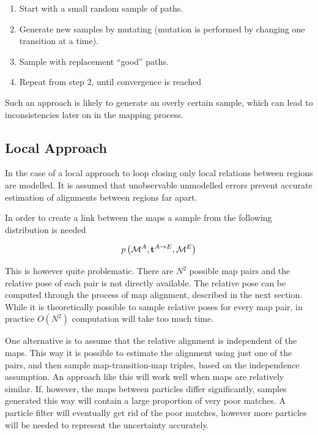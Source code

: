 \begin{enumerate}
\item Start with a small random sample of paths. 
\item Generate new samples by mutating (mutation is performed by
  changing one transition at a time).
\item Sample with replacement ``good'' paths.
\item Repeat from step 2, until convergence is reached
\end{enumerate}

Such an approach is likely to generate an overly certain sample, which
can lead to inconsistencies later on in the mapping process.




\subsection{Local Approach}

In the case of a local approach to loop closing only local relations
between regions are modelled. It is assumed that unobservable
unmodelled errors prevent accurate estimation of alignments between
regions far apart.

In order to create a link between the maps a sample from the following
distribution is needed

$$
\prob{\mapA,\tr{}{A}{E},\mapE} 
$$

This is however quite problematic. There are $N^2$ possible map pairs
and the relative pose of each pair is not directly available. The
relative pose can be computed through the process of map alignment,
described in the next section. While it is theoretically possible to
sample relative poses for every map pair, in practice $O(N^2)$
computation will take too much time.

One alternative is to assume that the relative alignment is
independent of the maps. This way it is possible to estimate the
alignment using just one of the pairs, and then sample
map-transition-map triples, based on the independence
assumption. An approach like this will work well when maps are relatively
similar. If, however, the maps between particles differ significantly,
samples generated this way will contain a large proportion of very poor
matches. A particle filter will eventually get rid of the poor matches,
however more particles will be needed to represent the uncertainty
accurately.

